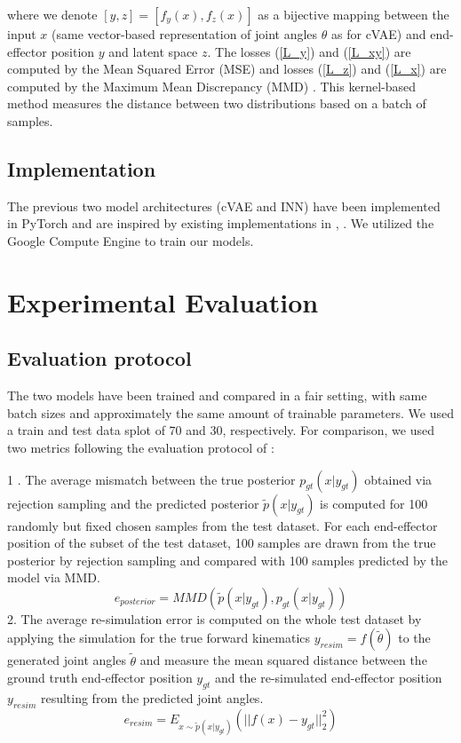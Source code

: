 \documentclass[conference]{IEEEtran}
\begin{document}
where we denote $[y, z] = [f_y(x), f_z(x)]$ as a bijective mapping between the input $x$ (same vector-based representation of joint angles $\theta$ as for cVAE) and end-effector position $y$ and latent space $z$. The losses (\ref{L_y}) and (\ref{L_xy}) are computed by the Mean Squared Error (MSE) and losses (\ref{L_z}) and (\ref{L_x}) are computed by the Maximum Mean Discrepancy (MMD) \cite{Gretton2008}. This kernel-based method measures the distance between two distributions based on a batch of samples.

\subsection*{Implementation}
The previous two model architectures (cVAE and INN) have been implemented in PyTorch and are inspired by existing implementations in  \cite{graviraja2019}, \cite{freia2020}. We utilized the Google Compute Engine to train our models.

\section*{Experimental Evaluation}
\subsection*{Evaluation protocol}
The two models have been trained and compared in a fair setting, with same batch sizes and approximately the same amount of trainable parameters. We used a train and test data splot of 70 and 30, respectively. For comparison, we used two metrics following the evaluation protocol of \cite{Kruse2019}:

1 . The average mismatch between the true posterior $p_{gt}(x | y_{gt})$ obtained via rejection sampling and the predicted posterior $\tilde p(x | y_{gt})$ is computed for 100 randomly but fixed chosen samples from the test dataset. For each end-effector position of the subset of the test dataset, 100 samples are drawn from the true posterior by rejection sampling and compared with 100 samples predicted by the model via MMD.
\begin{equation}
e_{posterior} = MMD(\tilde p(x | y_{gt}), p_{gt}(x | y_{gt}))
\end{equation}
2. The average re-simulation error is computed on the whole test dataset by applying the simulation for the true forward kinematics $y_{resim} = f( \tilde \theta)$ to the generated joint angles $\tilde \theta$ and measure the mean squared distance between the ground truth end-effector position $y_{gt}$ and the re-simulated end-effector position $y_{resim}$ resulting from the predicted joint angles.
\begin{equation}
e_{resim} = E_{x \sim \tilde{p}(x|y_{gt})}(|| f(x) - y_{gt}||^2_2)
\end{equation}
\end{document}

